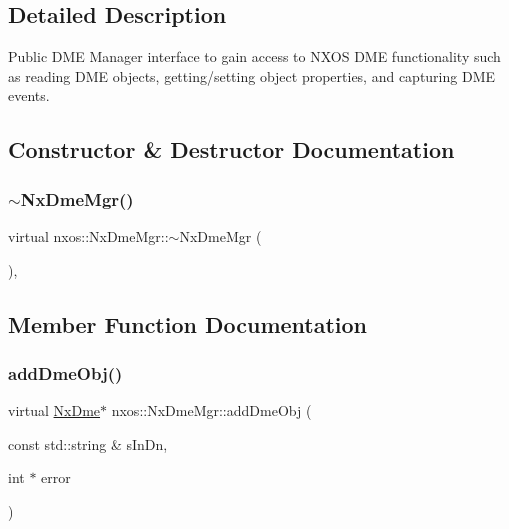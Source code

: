 \subsection{Detailed Description}
Public D\+ME Manager interface to gain access to N\+X\+OS D\+ME functionality such as reading D\+ME objects, getting/setting object properties, and capturing D\+ME events. 

\subsection{Constructor \& Destructor Documentation}
\mbox{\label{classnxos_1_1_nx_dme_mgr_a8e64bc40ea7fc589711b5abf3fbd76d7}} 
\subsubsection{\texorpdfstring{$\sim$\+Nx\+Dme\+Mgr()}{~NxDmeMgr()}}
{\footnotesize\ttfamily virtual nxos\+::\+Nx\+Dme\+Mgr\+::$\sim$\+Nx\+Dme\+Mgr (\begin{DoxyParamCaption}{ }\end{DoxyParamCaption})\hspace{0.3cm}{\ttfamily [inline]}, {\ttfamily [virtual]}}



\subsection{Member Function Documentation}
\mbox{\label{classnxos_1_1_nx_dme_mgr_a9bbf25e6b6565bfef6f81e5d74ba4a9d}} 
\subsubsection{\texorpdfstring{add\+Dme\+Obj()}{addDmeObj()}}
{\footnotesize\ttfamily virtual \mbox{\hyperlink{classnxos_1_1_nx_dme}{Nx\+Dme}}$\ast$ nxos\+::\+Nx\+Dme\+Mgr\+::add\+Dme\+Obj (\begin{DoxyParamCaption}\item[{const std\+::string \&}]{s\+In\+Dn,  }\item[{int $\ast$}]{error }\end{DoxyParamCaption})\hspace{0.3cm}{\ttfamily [pure virtual]}}

